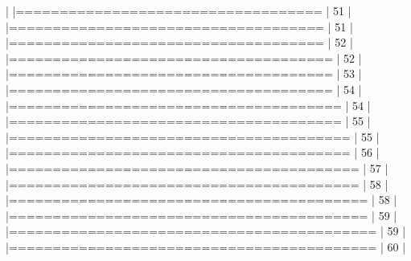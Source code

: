 \documentclass{article}
\begin{document}
\begin{Schunk}
\begin{Soutput}
  |                                                                            
  |===================================                                   |  51%
  |                                                                            
  |====================================                                  |  51%
  |                                                                            
  |====================================                                  |  52%
  |                                                                            
  |=====================================                                 |  52%
  |                                                                            
  |=====================================                                 |  53%
  |                                                                            
  |=====================================                                 |  54%
  |                                                                            
  |======================================                                |  54%
  |                                                                            
  |======================================                                |  55%
  |                                                                            
  |=======================================                               |  55%
  |                                                                            
  |=======================================                               |  56%
  |                                                                            
  |========================================                              |  57%
  |                                                                            
  |========================================                              |  58%
  |                                                                            
  |=========================================                             |  58%
  |                                                                            
  |=========================================                             |  59%
  |                                                                            
  |==========================================                            |  59%
  |                                                                            
  |==========================================                            |  60%
  |                                                                            

\end{Soutput}
\end{Schunk}
\end{document}
